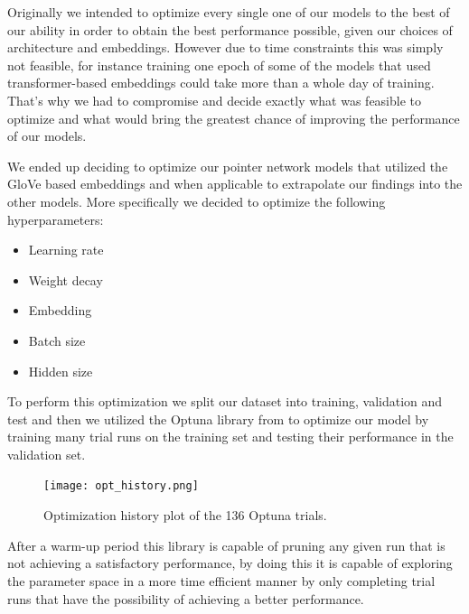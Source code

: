 Originally we intended to optimize every single one of our models to the best of our ability in order to obtain the best performance possible, given our choices of architecture and embeddings. However due to time constraints this was simply not feasible, for instance training one epoch of some of the models that used transformer-based embeddings could take more than a whole day of training. That's why we had to compromise and decide exactly what was feasible to optimize and what would bring the greatest chance of improving the performance of our models.


We ended up deciding to optimize our pointer network models that utilized the GloVe based embeddings and when applicable to extrapolate our findings into the other models. More specifically we decided to optimize the following hyperparameters:


\begin{itemize}
\item Learning rate
\item Weight decay
\item Embedding
\item Batch size
\item Hidden size
\end{itemize}


To perform this optimization we split our dataset into training, validation and test and then we utilized the Optuna library from \citet{optuna} to optimize our model by training many trial runs on the training set and testing their performance in the validation set. 

\begin{figure}[!ht]
\centerline{\texttt{[image: opt\_history.png]}   }
\caption{Optimization history plot of the 136 Optuna trials.}
\label{hist}
\end{figure}


 After a warm-up period this library is capable of pruning any given run that is not achieving a satisfactory performance,  by doing this it is capable of exploring the parameter space in a more time efficient manner by only completing trial runs that have the possibility of achieving a better performance. 



